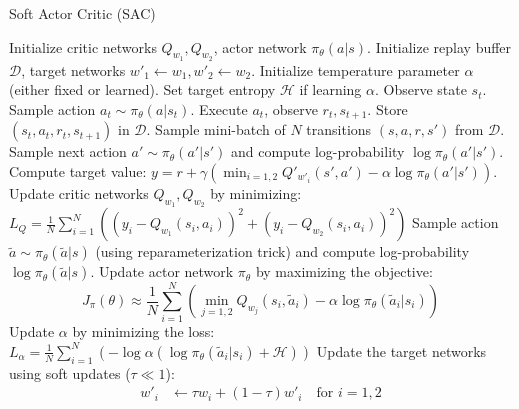 \begin{frame}{Soft Actor Critic (SAC)}
    \begin{algorithm}[H]
        \captionsetup{font=scriptsize}
        \caption{Soft Actor-Critic}
        \begin{algorithmic}[1]
        \scriptsize
        \STATE Initialize critic networks $Q_{w_1}, Q_{w_2}$, actor network $\pi_{\theta}(a|s)$.
        \STATE Initialize replay buffer $\mathcal{D}$, target networks $w'_1 \leftarrow w_1, w'_2 \leftarrow w_2$.
        \STATE Initialize temperature parameter $\alpha$ (either fixed or learned). Set target entropy $\mathcal{H}$ if learning $\alpha$.
            \STATE Observe state $s_t$. Sample action $a_t \sim \pi_\theta(a|s_t)$.
            \STATE Execute $a_t$, observe $r_t, s_{t+1}$. Store $(s_t, a_t, r_t, s_{t+1})$ in $\mathcal{D}$.
            \STATE Sample mini-batch of $N$ transitions $(s, a, r, s')$ from $\mathcal{D}$.
            \STATE Sample next action $a' \sim \pi_\theta(a'|s')$ and compute log-probability $\log \pi_\theta(a'|s')$.
            \STATE Compute target value: $y = r + \gamma \left( \min_{i=1,2} Q'_{w'_i}(s', a') - \alpha \log \pi_\theta(a'|s') \right)$.
            \STATE Update critic networks $Q_{w_1}, Q_{w_2}$ by minimizing:
            \( L_Q = \frac{1}{N} \sum_{i=1}^N \left( (y_i - Q_{w_1}(s_i, a_i))^2 + (y_i - Q_{w_2}(s_i, a_i))^2 \right) \)
            \STATE Sample action $\tilde{a} \sim \pi_\theta(\tilde{a}|s)$ (using reparameterization trick) and compute log-probability $\log \pi_\theta(\tilde{a}|s)$.
            \STATE Update actor network $\pi_\theta$ by maximizing the objective:
            \[ J_\pi(\theta) \approx \frac{1}{N} \sum_{i=1}^N \left( \min_{j=1,2} Q_{w_j}(s_i, \tilde{a}_i) - \alpha \log \pi_\theta(\tilde{a}_i|s_i) \right) \]
            \STATE Update $\alpha$ by minimizing the loss:
            \( L_\alpha = \frac{1}{N} \sum_{i=1}^N (-\log \alpha (\log \pi_\theta(\tilde{a}_i|s_i) + \mathcal{H})) \)
            \STATE Update the target networks using soft updates ($\tau \ll 1$):
            \begin{align*}
                w'_i &\leftarrow \tau w_i + (1-\tau) w'_i \quad \text{for } i=1,2
            \end{align*}
        \ENDFOR
        \end{algorithmic}
    \end{algorithm}
\end{frame}

